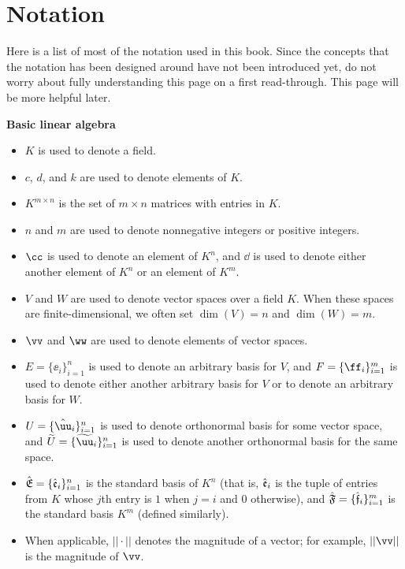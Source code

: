 \chapter*{Notation}

Here is a list of most of the notation used in this book. Since the concepts that the notation has been designed around have not been introduced yet, do not worry about fully understanding this page on a first read-through. This page will be more helpful later.

\small

\vspace{.25cm}

\textbf{Basic linear algebra}

\begin{itemize}
    \item $K$ is used to denote a field.
    \item $c$, $d$, and $k$ are used to denote elements of $K$.
    \item $K^{m \times n}$ is the set of $m \times n$ matrices with entries in $K$.
    \item $n$ and $m$ are used to denote nonnegative integers or positive integers.
    \item $\cc$ is used to denote an element of $K^n$, and $\dd$ is used to denote either another element of $K^n$ or an element of $K^m$.
    \item $V$ and $W$ are used to denote vector spaces over a field $K$. When these spaces are finite-dimensional, we often set $\dim(V) = n$ and $\dim(W) = m$.
    \item $\vv$ and $\ww$ are used to denote elements of vector spaces.
    \item $E = \{\ee_i\}_{i = 1}^n$ is used to denote an arbitrary basis for $V$, and $F = \{\ff_i\}_{i = 1}^m$ is used to denote either another arbitrary basis for $V$ or to denote an arbitrary basis for $W$.
    \item $U = \{\huu_i\}_{i = 1}^n$ is used to denote orthonormal basis for some vector space, and $\tU = \{\tuu_i\}_{i = 1}^n$ is used to denote another orthonormal basis for the same space.
    \item ${\hat{\mathfrak{E}}} = \{\hat{\mathfrak{e}}_i\}_{i = 1}^n$ is the standard basis of $K^n$ (that is, $\hat{\mathfrak{e}}_i$ is the tuple of entries from $K$ whose $j$th entry is $1$ when $j = i$ and $0$ otherwise), and ${\hat{\mathfrak{F}}} = \{\hat{\mathfrak{f}}_i\}_{i = 1}^m$ is the standard basis $K^m$ (defined similarly).
    \item When applicable, $||\cdot||$ denotes the magnitude of a vector; for example, $||\vv||$ is the magnitude of $\vv$.

\end{itemize}
